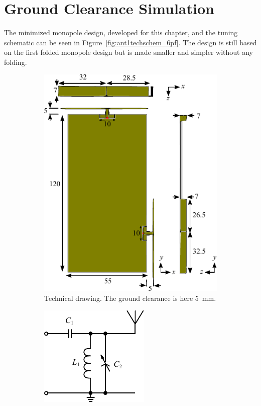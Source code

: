 \FloatBarrier
\section{Ground Clearance Simulation}

The minimized monopole design, developed for this chapter, and the tuning schematic can be seen in Figure~\ref{fig:ant1techschem_6pf}. The design is still based on the first folded monopole design but is made smaller and simpler without any folding.

\begin{figure}[htbp]
    \begin{subfigure}[b]{0.49\linewidth}
        \centering
        \includegraphics{img/tech_sol/monopole/5mm/3d_drawing/3d_drawing}
        \caption{Technical drawing. The ground clearance is here \SI{5}{mm}.}
        \label{fig:ant1technical_6pf}
    \end{subfigure}
    \hfill
    \begin{subfigure}[b]{0.49\linewidth}
        \centering
        \includegraphics{img/tech_sol/schematic_tuning_1}\\[1cm]

\end{subfigure}
\end{figure}
